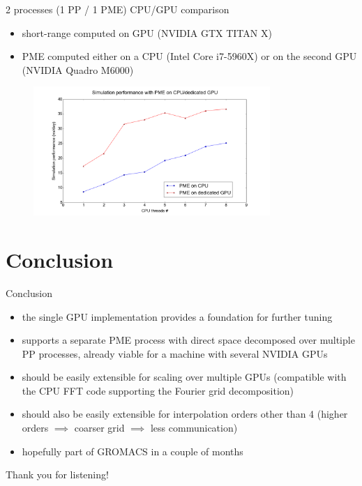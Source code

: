 \documentclass[11pt]{beamer}
\begin{document}
\begin{frame}{2 processes (1 PP / 1 PME) CPU/GPU comparison}
\begin{itemize}
\item short-range computed on GPU (NVIDIA GTX TITAN X)
\item PME computed either on a CPU (Intel Core i7-5960X) or on the second GPU (NVIDIA Quadro M6000)
\end{itemize}
\FloatBarrier
\begin{figure} [h!]
    \centering
    \includegraphics[width=0.8\textwidth]{pics/CPU_GPU_ADH.png}
    \label{fig:sepGPUNEW}
\end{figure}
\FloatBarrier
\end{frame}

\section{Conclusion}

\begin{frame}{Conclusion}
\begin{itemize}
\item the single GPU implementation provides a foundation for further tuning
\item supports a separate PME process with direct space decomposed over multiple PP processes, already viable for a machine with several NVIDIA GPUs 
\item should be easily extensible for scaling over multiple GPUs
(compatible with the CPU FFT code supporting the Fourier grid decomposition)
\item should also be easily extensible for interpolation orders other than 4
(higher orders $\implies$ coarser grid $\implies$ less communication)
\item hopefully part of GROMACS in a couple of months
\end{itemize}
\end{frame}

\begin{frame}[plain]
      Thank you for listening!
\end{frame}



\end{document}
